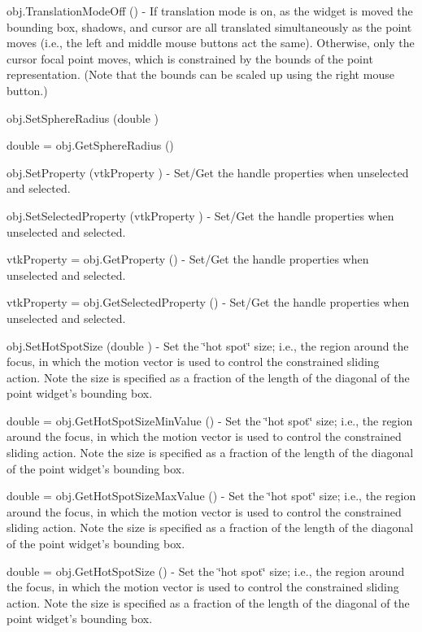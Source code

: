 \begin{DoxyItemize}
\item {\ttfamily obj.\-Translation\-Mode\-Off ()} -\/ If translation mode is on, as the widget is moved the bounding box, shadows, and cursor are all translated simultaneously as the point moves (i.\-e., the left and middle mouse buttons act the same). Otherwise, only the cursor focal point moves, which is constrained by the bounds of the point representation. (Note that the bounds can be scaled up using the right mouse button.)  
\item {\ttfamily obj.\-Set\-Sphere\-Radius (double )}  
\item {\ttfamily double = obj.\-Get\-Sphere\-Radius ()}  
\item {\ttfamily obj.\-Set\-Property (vtk\-Property )} -\/ Set/\-Get the handle properties when unselected and selected.  
\item {\ttfamily obj.\-Set\-Selected\-Property (vtk\-Property )} -\/ Set/\-Get the handle properties when unselected and selected.  
\item {\ttfamily vtk\-Property = obj.\-Get\-Property ()} -\/ Set/\-Get the handle properties when unselected and selected.  
\item {\ttfamily vtk\-Property = obj.\-Get\-Selected\-Property ()} -\/ Set/\-Get the handle properties when unselected and selected.  
\item {\ttfamily obj.\-Set\-Hot\-Spot\-Size (double )} -\/ Set the \char`\"{}hot spot\char`\"{} size; i.\-e., the region around the focus, in which the motion vector is used to control the constrained sliding action. Note the size is specified as a fraction of the length of the diagonal of the point widget's bounding box.  
\item {\ttfamily double = obj.\-Get\-Hot\-Spot\-Size\-Min\-Value ()} -\/ Set the \char`\"{}hot spot\char`\"{} size; i.\-e., the region around the focus, in which the motion vector is used to control the constrained sliding action. Note the size is specified as a fraction of the length of the diagonal of the point widget's bounding box.  
\item {\ttfamily double = obj.\-Get\-Hot\-Spot\-Size\-Max\-Value ()} -\/ Set the \char`\"{}hot spot\char`\"{} size; i.\-e., the region around the focus, in which the motion vector is used to control the constrained sliding action. Note the size is specified as a fraction of the length of the diagonal of the point widget's bounding box.  
\item {\ttfamily double = obj.\-Get\-Hot\-Spot\-Size ()} -\/ Set the \char`\"{}hot spot\char`\"{} size; i.\-e., the region around the focus, in which the motion vector is used to control the constrained sliding action. Note the size is specified as a fraction of the length of the diagonal of the point widget's bounding box.  

\end{DoxyItemize}
